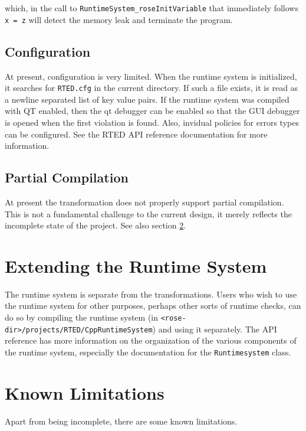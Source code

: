 which, in the call to \texttt{RuntimeSystem\_roseInitVariable} that immediately
follows \texttt{x = z} will detect the memory leak and terminate the program.

\subsection{Configuration}

At present, configuration is very limited.  When the runtime system is
initialized, it searches for \texttt{RTED.cfg} in the current directory.  If
such a file exists, it is read as a newline separated list of key value pairs.
If the runtime system was compiled with QT enabled, then the qt debugger can be
enabled so that the GUI debugger is opened when the first violation is found.
Also, invidual policies for errors types can be configured.  See the RTED API reference
documentation for more information.


\subsection{Partial Compilation}

At present the transformation does not properly support partial compilation.
This is not a fundamental challenge to the current design, it merely reflects
the incomplete state of the project.  See also section
\ref{RTED:known-limitations}.


\section{Extending the Runtime System}%

The runtime system is separate from the transformations.  Users who wish to use
the runtime system for other purposes, perhaps other sorts of runtime checks,
can do so by compiling the runtime system (in
\texttt{<rose-dir>/projects/RTED/CppRuntimeSystem}) and using it separately.
The API reference has more information on the organization of the
various components of the runtime system, especially the documentation for the
\texttt{Runtimesystem} class.



\section{Known Limitations}%

\label{RTED:known-limitations}


Apart from being incomplete, there are some known limitations.

